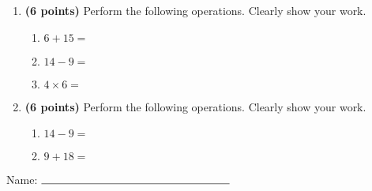 \documentclass[12pt]{amsart}
\begin{document}
\newpage
\begin{enumerate}
\item {\bf (6 points)} 
 Perform the following operations. Clearly show your work. \begin{enumerate}


\def \a{6}\def \b{15}\def \apb{21}

 
\item $\a + \b = $

\vspace{2cm}
\def \a{14}\def \dif{5}\def \b{9}

 
\item $\a - \b = $

\vspace{2cm}
\def \a{4}\def \b{6}\def \ab{10}

 
\item $\a \times \b = $ 

\vspace{2cm}
\def \vshift{1}\def \hshift{2}\def \chang{0}\def \findval{2}\def \yval{1}

 
\end{enumerate}


\newpage
\item {\bf (6 points)} 
 Perform the following operations. Clearly show your work. \begin{enumerate}


\def \a{14}\def \dif{5}\def \b{9}

 
\item $\a - \b = $

\vspace{2cm}
\def \a{9}\def \b{18}\def \apb{27}

 
\item $\a + \b = $

\vspace{2cm}
\def \vshift{-3}\def \hshift{-4}\def \chang{1}\def \findval{-3}\def \yval{-5}

 
\end{enumerate}


\newpage\end{enumerate}\graphicspath{{/Users/jilan/Downloads/Randomizer/Randomizer/Sample Course/Sample Assessment 2/}}\setcounter{page}{1}


\thispagestyle{fancy}

 
\noindent Name: $\rule{6cm}{0.15mm}$

\vspace{.2cm}
\end{document}
